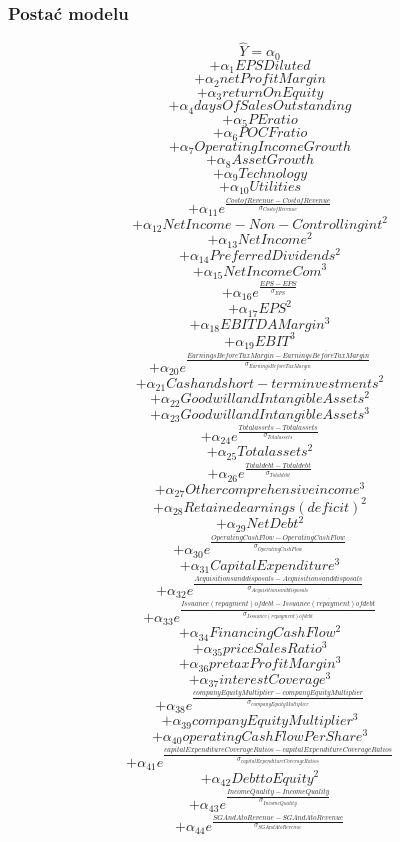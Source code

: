 \documentclass{article}
\begin{document}
\subsubsection{Postać modelu}
\[ \hat{Y} = \alpha_0\]
\[+\alpha_{1}EPS Diluted\]
\[+\alpha_{2}netProfitMargin\]
\[+\alpha_{3}returnOnEquity\]
\[+\alpha_{4}daysOfSalesOutstanding\]
\[+\alpha_{5}PE ratio\]
\[+\alpha_{6}POCF ratio\]
\[+\alpha_{7}Operating Income Growth\]
\[+\alpha_{8}Asset Growth\]
\[+\alpha_{9}Technology\]
\[+\alpha_{10}Utilities\]
\[+\alpha_{11}e^{\frac{Cost of Revenue - \overline{Cost of Revenue}}{\sigma_{Cost of Revenue}}}\]
\[+\alpha_{12}Net Income - Non-Controlling int^2\]
\[+\alpha_{13}Net Income^2\]
\[+\alpha_{14}Preferred Dividends^2\]
\[+\alpha_{15}Net Income Com^3\]
\[+\alpha_{16}e^{\frac{EPS - \overline{EPS}}{\sigma_{EPS}}}\]
\[+\alpha_{17}EPS^2\]
\[+\alpha_{18}EBITDA Margin^3\]
\[+\alpha_{19}EBIT^3\]
\[+\alpha_{20}e^{\frac{Earnings Before Tax Margin - \overline{Earnings Before Tax Margin}}{\sigma_{Earnings Before Tax Margin}}}\]
\[+\alpha_{21}Cash and short-term investments^2\]
\[+\alpha_{22}Goodwill and Intangible Assets^2\]
\[+\alpha_{23}Goodwill and Intangible Assets^3\]
\[+\alpha_{24}e^{\frac{Total assets - \overline{Total assets}}{\sigma_{Total assets}}}\]
\[+\alpha_{25}Total assets^2\]
\[+\alpha_{26}e^{\frac{Total debt - \overline{Total debt}}{\sigma_{Total debt}}}\]
\[+\alpha_{27}Other comprehensive income^3\]
\[+\alpha_{28}Retained earnings (deficit)^2\]
\[+\alpha_{29}Net Debt^2\]
\[+\alpha_{30}e^{\frac{Operating Cash Flow - \overline{Operating Cash Flow}}{\sigma_{Operating Cash Flow}}}\]
\[+\alpha_{31}Capital Expenditure^3\]
\[+\alpha_{32}e^{\frac{Acquisitions and disposals - \overline{Acquisitions and disposals}}{\sigma_{Acquisitions and disposals}}}\]
\[+\alpha_{33}e^{\frac{Issuance (repayment) of debt - \overline{Issuance (repayment) of debt}}{\sigma_{Issuance (repayment) of debt}}}\]
\[+\alpha_{34}Financing Cash Flow^2\]
\[+\alpha_{35}priceSalesRatio^3\]
\[+\alpha_{36}pretaxProfitMargin^3\]
\[+\alpha_{37}interestCoverage^3\]
\[+\alpha_{38}e^{\frac{companyEquityMultiplier - \overline{companyEquityMultiplier}}{\sigma_{companyEquityMultiplier}}}\]
\[+\alpha_{39}companyEquityMultiplier^3\]
\[+\alpha_{40}operatingCashFlowPerShare^3\]
\[+\alpha_{41}e^{\frac{capitalExpenditureCoverageRatios - \overline{capitalExpenditureCoverageRatios}}{\sigma_{capitalExpenditureCoverageRatios}}}\]
\[+\alpha_{42}Debt to Equity^2\]
\[+\alpha_{43}e^{\frac{Income Quality - \overline{Income Quality}}{\sigma_{Income Quality}}}\]
\[+\alpha_{44}e^{\frac{SGAndA to Revenue - \overline{SGAndA to Revenue}}{\sigma_{SGAndA to Revenue}}}\]
\end{document}
